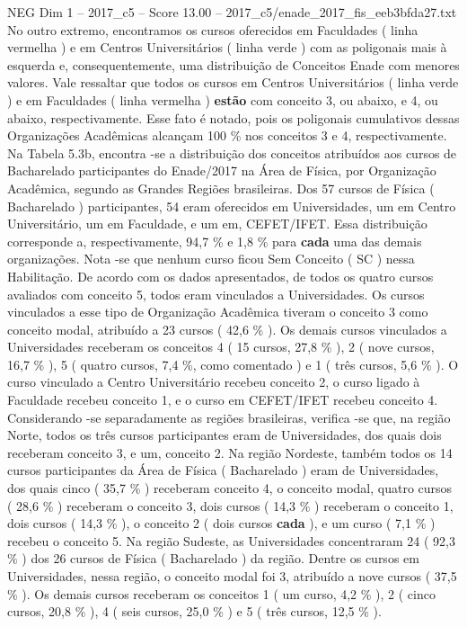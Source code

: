 \begin{textsample}{NEG Dim 1 – 2017\_c5 – Score 13.00 – 2017\_c5/enade\_2017\_fis\_eeb3bfda27.txt}
No outro extremo, encontramos os cursos oferecidos em Faculdades ( linha vermelha ) e em Centros Universitários ( linha verde ) com as poligonais mais à esquerda e, consequentemente, uma distribuição de Conceitos Enade com menores valores.
Vale ressaltar que todos os cursos em Centros Universitários ( linha verde ) e em Faculdades ( linha vermelha ) \textbf{estão} com conceito 3, ou abaixo, e 4, ou abaixo, respectivamente.
Esse fato é notado, pois os poligonais cumulativos dessas Organizações Acadêmicas alcançam 100 \% nos conceitos 3 e 4, respectivamente.
Na Tabela 5.3b, encontra -se a distribuição dos conceitos atribuídos aos cursos de Bacharelado participantes do Enade/2017 na Área de Física, por Organização Acadêmica, segundo as Grandes Regiões brasileiras.
Dos 57 cursos de Física ( Bacharelado ) participantes, 54 eram oferecidos em Universidades, um em Centro Universitário, um em Faculdade, e um em, CEFET/IFET.
Essa distribuição corresponde a, respectivamente, 94,7 \% e 1,8 \% para \textbf{cada} uma das demais organizações.
Nota -se que nenhum curso ficou Sem Conceito ( SC ) nessa Habilitação.
De acordo com os dados apresentados, de todos os quatro cursos avaliados com conceito 5, todos eram vinculados a Universidades.
Os cursos vinculados a esse tipo de Organização Acadêmica tiveram o conceito 3 como conceito modal, atribuído a 23 cursos ( 42,6 \% ).
Os demais cursos vinculados a Universidades receberam os conceitos 4 ( 15 cursos, 27,8 \% ), 2 ( nove cursos, 16,7 \% ), 5 ( quatro cursos, 7,4 \%, como comentado ) e 1 ( três cursos, 5,6 \% ).
O curso vinculado a Centro Universitário recebeu conceito 2, o curso ligado à Faculdade recebeu conceito 1, e o curso em CEFET/IFET recebeu conceito 4.
Considerando -se separadamente as regiões brasileiras, verifica -se que, na região Norte, todos os três cursos participantes eram de Universidades, dos quais dois receberam conceito 3, e um, conceito 2.
Na região Nordeste, também todos os 14 cursos participantes da Área de Física ( Bacharelado ) eram de Universidades, dos quais cinco ( 35,7 \% ) receberam conceito 4, o conceito modal, quatro cursos ( 28,6 \% ) receberam o conceito 3, dois cursos ( 14,3 \% ) receberam o conceito 1, dois cursos ( 14,3 \% ), o conceito 2 ( dois cursos \textbf{cada} ), e um curso ( 7,1 \% ) recebeu o conceito 5.
Na região Sudeste, as Universidades concentraram 24 ( 92,3 \% ) dos 26 cursos de Física ( Bacharelado ) da região.
Dentre os cursos em Universidades, nessa região, o conceito modal foi 3, atribuído a nove cursos ( 37,5 \% ).
Os demais cursos receberam os conceitos 1 ( um curso, 4,2 \% ), 2 ( cinco cursos, 20,8 \% ), 4 ( seis cursos, 25,0 \% ) e 5 ( três cursos, 12,5 \% ).

\end{textsample}
